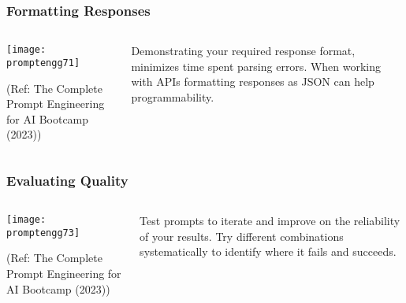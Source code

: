 \begin{frame}[fragile]\frametitle{Formatting Responses}

\begin{columns}
    \begin{column}[T]{0.6\linewidth}
		\begin{center}
		\texttt{[image: promptengg71]}

		{\tiny (Ref: The Complete Prompt Engineering for AI Bootcamp (2023))}
		\end{center}	
    \end{column}
    \begin{column}[T]{0.4\linewidth}
		Demonstrating your required response format, minimizes time spent parsing errors. 
		When working with APIs formatting responses as JSON can help programmability.
    \end{column}
  \end{columns}
\end{frame}

\begin{frame}[fragile]\frametitle{Evaluating Quality}

\begin{columns}
    \begin{column}[T]{0.6\linewidth}
		\begin{center}
		\texttt{[image: promptengg73]}

		{\tiny (Ref: The Complete Prompt Engineering for AI Bootcamp (2023))}
		\end{center}	
    \end{column}
    \begin{column}[T]{0.4\linewidth}
		Test prompts to iterate and improve on the reliability of your results.
		Try different combinations systematically to identify where it fails and succeeds.
    \end{column}
  \end{columns}
\end{frame}

